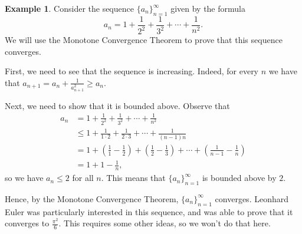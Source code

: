 \documentclass[12pt]{amsart}
\numberwithin{equation}{section}
\theoremstyle{plain} %
\theoremstyle{definition}
\newtheorem{ex}[equation]{Example}
\theoremstyle{remark}
\begin{document}
\begin{ex}
	Consider the sequence $\{a_n\}_{n=1}^\infty$ given by the formula
	\[ a_n = 1 + \frac{1}{2^2} + \frac{1}{3^2} + \cdots + \frac{1}{n^2}.\]
	We will use the Monotone Convergence Theorem to prove that this sequence converges.
	
	First, we need to see that the sequence is increasing. Indeed, for every $n$ we have that $a_{n+1} = a_n + \frac{1}{a_{n+1}^2} \geq a_n$.
	
	Next, we need to show that it is bounded above. Observe that
	\begin{align*} 
a_n &= 1 + \frac{1}{2^2} + \frac{1}{3^2} + \cdots + \frac{1}{n^2} \\
&\leq 1 + \frac{1}{1 \cdot 2} + \frac{1}{2 \cdot 3} + \cdots + \frac{1}{(n-1) n}\\
&= 1+ (\frac{1}{1} - \frac{1}{2}) + (\frac{1}{2} - \frac{1}{3})
 + \cdots +  (\frac{1}{n-1} - \frac{1}{n})\\
 &= 1 + 1 - \frac{1}{n},
		\end{align*}
		so we have $a_n \leq 2$ for all $n$. This means that $\{a_n\}_{n=1}^\infty$ is bounded above by $2$. 
		
		Hence, by the Monotone Convergence Theorem, $\{a_n\}_{n=1}^\infty$ converges. Leonhard Euler was particularly interested in this sequence, and was able to prove that it converges to $\frac{\pi^2}{6}$. This requires some other ideas, so we won't do that here.
	\end{ex}
\end{document}
